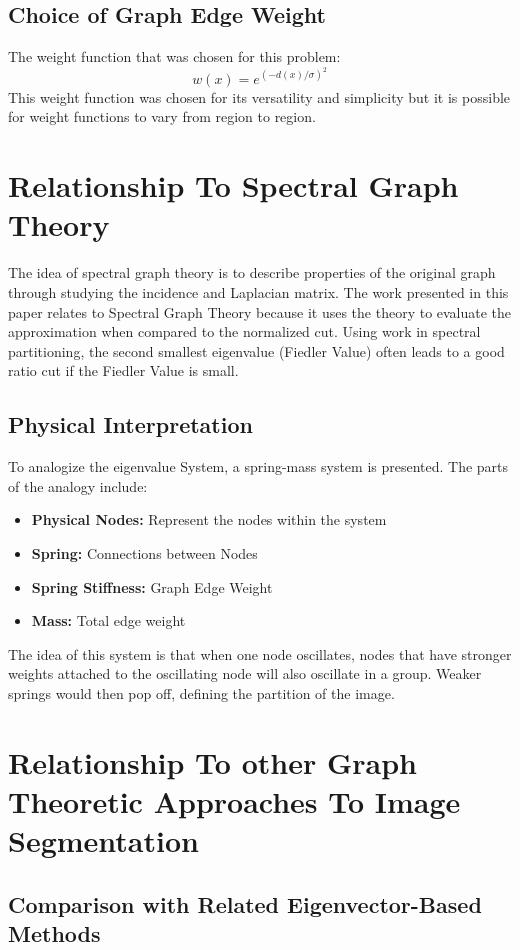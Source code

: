 \documentclass[letterpaper, 10 pt, conference]{ieeeconf}  %
\begin{document}
\subsection{Choice of Graph Edge Weight}
The weight function that was chosen for this problem:
\begin{equation}
    w(x) = e^{(-d(x)/\sigma)^2}
\end{equation}
This weight function was chosen for its versatility and simplicity but it is possible for weight functions to vary from region to region.
\section{Relationship To Spectral Graph Theory}
The idea of spectral graph theory is to describe properties of the original graph through studying the incidence and Laplacian matrix.
The work presented in this paper relates to Spectral Graph Theory because it uses the theory to evaluate the approximation when compared to the normalized cut.
\smallbreak
Using work in spectral partitioning, the second smallest eigenvalue (Fiedler Value) often leads to a good ratio cut if the Fiedler Value is small. 
\subsection{Physical Interpretation}
To analogize the eigenvalue System, a spring-mass system is presented. The parts of the analogy include:
\begin{itemize}
\item \textbf{Physical Nodes:} Represent the nodes within the system
    \item \textbf{Spring:} Connections between Nodes
    \item \textbf{Spring Stiffness:} Graph Edge Weight
    \item \textbf{Mass:} Total edge weight
\end{itemize}
The idea of this system is that when one node oscillates, nodes that have stronger weights attached to the oscillating node will also oscillate in a group. Weaker springs would then pop off, defining the partition of the image.
\section{Relationship To other Graph Theoretic Approaches To Image Segmentation}
\subsection{Comparison with Related Eigenvector-Based Methods}
\end{document}
